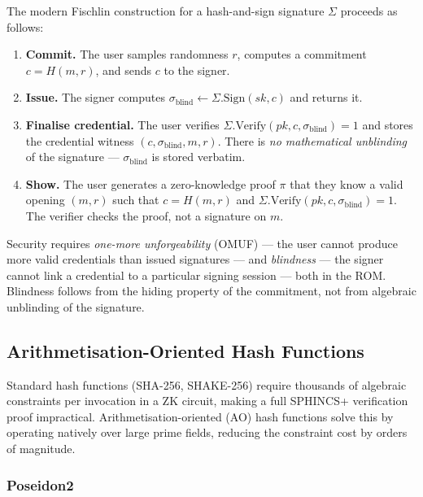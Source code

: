 \documentclass[11pt,a4paper]{article}
\newcommand{\ROM}{\textsf{ROM}}
\newcommand{\OMUF}{\textsf{OMUF}}
\begin{document}
The modern Fischlin construction for a hash-and-sign signature $\Sigma$ proceeds as follows:

\begin{enumerate}[label=\textbf{Phase \arabic*.},leftmargin=*]
  \item \textbf{Commit.}  The user samples randomness $r$, computes a commitment
        $c = H(m, r)$, and sends $c$ to the signer.
  \item \textbf{Issue.}  The signer computes
        $\sigma_{\text{blind}} \leftarrow \Sigma.\text{Sign}(sk, c)$ and returns it.
  \item \textbf{Finalise credential.}  The user verifies
        $\Sigma.\text{Verify}(pk, c, \sigma_{\text{blind}}) = 1$ and stores the credential
        witness $(c, \sigma_{\text{blind}}, m, r)$.  There is \emph{no mathematical unblinding}
        of the signature --- $\sigma_{\text{blind}}$ is stored verbatim.
  \item \textbf{Show.}  The user generates a zero-knowledge proof $\pi$ that they know a valid
        opening $(m, r)$ such that $c = H(m, r)$ and
        $\Sigma.\text{Verify}(pk, c, \sigma_{\text{blind}}) = 1$.
        The verifier checks the proof, not a signature on $m$.
\end{enumerate}

Security requires \emph{one-more unforgeability} (\OMUF) --- the user cannot produce more valid
credentials than issued signatures --- and \emph{blindness} --- the signer cannot link a credential
to a particular signing session --- both in the \ROM.  Blindness follows from the hiding property
of the commitment, not from algebraic unblinding of the signature.

\subsection{Arithmetisation-Oriented Hash Functions}

Standard hash functions (SHA-256, SHAKE-256) require thousands of algebraic constraints per
invocation in a ZK circuit, making a full SPHINCS+ verification proof impractical.
Arithmetisation-oriented (AO) hash functions solve this by operating natively over large prime
fields, reducing the constraint cost by orders of magnitude.

\subsubsection*{Poseidon2}
\end{document}

